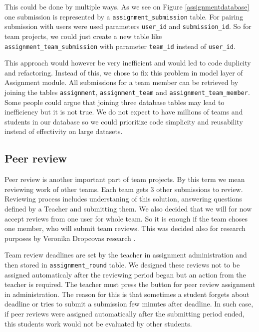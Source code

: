 This could be done by multiple ways. As we see on Figure \ref{assignmentdatabase} one submission is represented by a \texttt{assignment\_submission} table. For pairing submission with users were used parameters \texttt{user\_id} and \texttt{submission\_id}. So for team projects, we could just create a new table like \texttt{assignment\_team\_submission} with parameter \texttt{team\_id} instead of \texttt{user\_id}.

This approach would however be very inefficient and would led to code duplicity and refactoring. Instead of this, we chose to fix this problem in model layer of Assignment module. All submissions for a team member can be retrieved by joining the tables  \texttt{assignment}, \texttt{assignment\_team} and \texttt{assignment\_team\_member}. Some people could argue that joining three database tables may lead to inefficiency but it is not true. We do not expect to have millions of teams and students in our database so we could prioritize code simplicity and reusability instead of effectivity on large datasets.

\subsection{Peer review}
\label{sec:peerreview}
Peer review is another important part of team projects. By this term we mean reviewing work of other teams. Each team gets 3 other submissions to review. Reviewing process includes understaning of this solution, answering questions defined by a Teacher and submitting them. We also decided that we will for now accept reviews from one user for whole team. So it is enough if the team choses one member, who will submit team reviews. This was decided also for research purposes by Veronika Dropcovas research \cite{dropcova}. 


Team review deadlines are set by the teacher in assignment administration and then stored in \texttt{assignment\_round} table. We designed these reviews not to be assigned automaticaly after the reviewing period began but an action from the teacher is required. The teacher must press the button for peer review assignment in administration. The reason for this is that sometimes a student forgets about deadline or tries to submit a submission few minutes after deadline. In such case, if peer reviews were assigned automatically after the submitting period ended, this students work would not be evaluated by other students.

